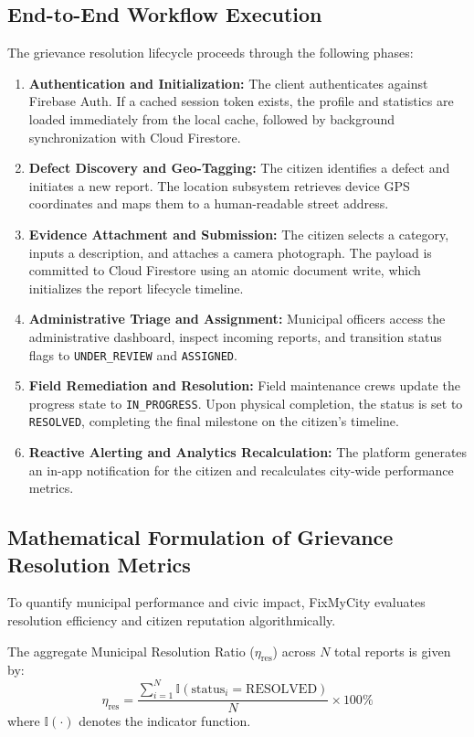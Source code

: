 \documentclass[conference]{IEEEtran}
\begin{document}
\subsection{End-to-End Workflow Execution}
The grievance resolution lifecycle proceeds through the following phases:
\begin{enumerate}
    \item \textbf{Authentication and Initialization:} The client authenticates against Firebase Auth. If a cached session token exists, the profile and statistics are loaded immediately from the local cache, followed by background synchronization with Cloud Firestore.
    \item \textbf{Defect Discovery and Geo-Tagging:} The citizen identifies a defect and initiates a new report. The location subsystem retrieves device GPS coordinates and maps them to a human-readable street address.
    \item \textbf{Evidence Attachment and Submission:} The citizen selects a category, inputs a description, and attaches a camera photograph. The payload is committed to Cloud Firestore using an atomic document write, which initializes the report lifecycle timeline.
    \item \textbf{Administrative Triage and Assignment:} Municipal officers access the administrative dashboard, inspect incoming reports, and transition status flags to \texttt{UNDER\_REVIEW} and \texttt{ASSIGNED}.
    \item \textbf{Field Remediation and Resolution:} Field maintenance crews update the progress state to \texttt{IN\_PROGRESS}. Upon physical completion, the status is set to \texttt{RESOLVED}, completing the final milestone on the citizen's timeline.
    \item \textbf{Reactive Alerting and Analytics Recalculation:} The platform generates an in-app notification for the citizen and recalculates city-wide performance metrics.
\end{enumerate}

\subsection{Mathematical Formulation of Grievance Resolution Metrics}

To quantify municipal performance and civic impact, FixMyCity evaluates resolution efficiency and citizen reputation algorithmically.

The aggregate Municipal Resolution Ratio ($\eta_{\text{res}}$) across $N$ total reports is given by:
\begin{equation}
\eta_{\text{res}} = \frac{\sum_{i=1}^{N} \mathbb{I}(\text{status}_i = \text{RESOLVED})}{N} \times 100\%
\end{equation}
where $\mathbb{I}(\cdot)$ denotes the indicator function.
\end{document}
